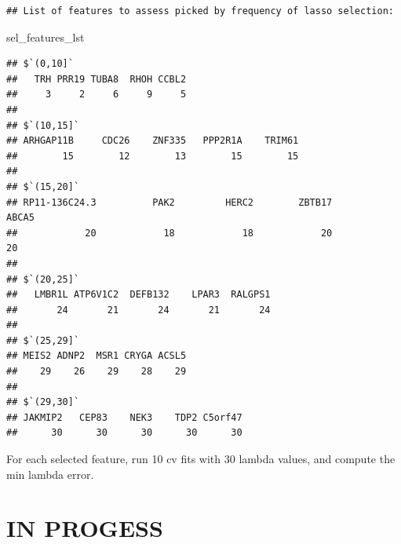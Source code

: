 \documentclass[
]{book}
\newenvironment{Shaded}{\begin{snugshade}}{\end{snugshade}}
\newcommand{\NormalTok}[1]{#1}
\begin{document}
\begin{verbatim}
## List of features to assess picked by frequency of lasso selection:
\end{verbatim}

\begin{Shaded}
\begin{Highlighting}[]
\NormalTok{sel\_features\_lst}
\end{Highlighting}
\end{Shaded}

\begin{verbatim}
## $`(0,10]`
##   TRH PRR19 TUBA8  RHOH CCBL2 
##     3     2     6     9     5 
## 
## $`(10,15]`
## ARHGAP11B     CDC26    ZNF335   PPP2R1A    TRIM61 
##        15        12        13        15        15 
## 
## $`(15,20]`
## RP11-136C24.3          PAK2         HERC2        ZBTB17         ABCA5 
##            20            18            18            20            20 
## 
## $`(20,25]`
##   LMBR1L ATP6V1C2  DEFB132    LPAR3  RALGPS1 
##       24       21       24       21       24 
## 
## $`(25,29]`
## MEIS2 ADNP2  MSR1 CRYGA ACSL5 
##    29    26    29    28    29 
## 
## $`(29,30]`
## JAKMIP2   CEP83    NEK3    TDP2 C5orf47 
##      30      30      30      30      30
\end{verbatim}

For each selected feature, run 10 cv fits with 30 lambda values, and compute the
min lambda error.

\hypertarget{in-progess}{%
\section*{IN PROGESS}\label{in-progess}}
\end{document}
